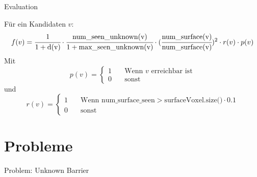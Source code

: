 \documentclass{beamer}
\begin{document}
\begin{frame}{Evaluation}
	\begin{block}{}
		Für ein Kandidaten $v$:
		\[f(v) = \cfrac{1}{1 + \text{d(v)}} \cdot \cfrac{\text{num\_seen\_unknown(v)}}{1 + \text{max\_seen\_unknown(v)}} \cdot (\cfrac{\text{num\_surface(v)}}{\text{num\_surface(v)}})^2 \cdot r(v) \cdot p(v)\]
		Mit \[p(v) = \begin{cases}
				1 & \quad \text{Wenn } v \text{ erreichbar ist} \\
				0 & \quad \text{sonst}
			\end{cases}\]
		und \[r(v) = \begin{cases}
				1 & \quad \text{Wenn  num\_surface\_seen} > \text{surfaceVoxel.size()} \cdot 0.1 \\
				0 & \quad \text{sonst}
			\end{cases}
		\]
	\end{block}
\end{frame}
\section{Probleme}
\begin{frame}{Problem: Unknown Barrier}

\end{frame}
\end{document}
